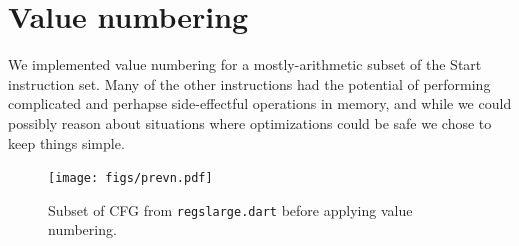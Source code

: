 \documentclass[10pt,twocolumn]{article}
\begin{document}
\section{Value numbering}

We implemented value numbering for a mostly-arithmetic subset of the
Start instruction set. Many of the other instructions had the
potential of performing complicated and perhapse side-effectful
operations in memory, and while we could possibly reason about
situations where optimizations could be safe we chose to keep things
simple.

\begin{figure}
\begin{center}
  \texttt{[image: figs/prevn.pdf]}
\begin{minipage}{0.95\columnwidth}
  \caption{\label{fig:prevn} Subset of CFG from \texttt{regslarge.dart} before applying value numbering.}
\end{minipage}
\end{center}
\end{figure}
\end{document}
